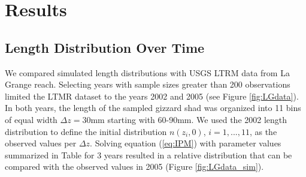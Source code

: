 \documentclass[11pt,oneside]{amsart}
\def\ds{\displaystyle}
\theoremstyle{definition}
\begin{document}


\section{Results}

\subsection{Length Distribution Over Time} 
We compared simulated length distributions with USGS LTRM data from La Grange reach. Selecting years with sample sizes greater than 200 observations limited the LTMR dataset to the years 2002 and 2005 (see Figure \ref{fig:LGdata}). In both years, the length of the sampled gizzard shad was organized into 11 bins of equal width $\Delta z = 30\mbox{mm}$ starting with 60-90mm.  We used the 2002 length distribution to define the initial distribution $\ds n(z_i,0)$, $i=1,...,11$, as the observed values per $\Delta z$. Solving equation (\ref{eq:IPM}) with parameter values summarized in Table \label{table:parameters} for 3 years resulted in a relative distribution that can be compared with the observed values in 2005 (Figure \ref{fig:LGdata_sim}).
\end{document}
